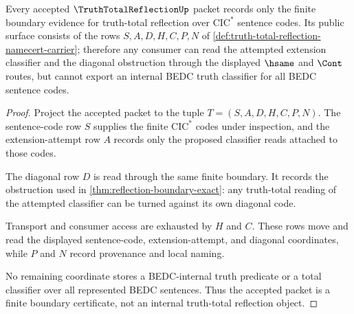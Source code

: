 \begin{theorem}
\label{thm:truth-total-reflection-namecert-boundary}
Every accepted $\TruthTotalReflectionUp$ packet records only the finite boundary evidence for truth-total reflection over $\mathrm{CIC}^{*}$ sentence codes. Its public surface consists of the rows $S,A,D,H,C,P,N$ of \autoref{def:truth-total-reflection-namecert-carrier}; therefore any consumer can read the attempted extension classifier and the diagonal obstruction through the displayed $\hsame$ and $\Cont$ routes, but cannot export an internal BEDC truth classifier for all BEDC sentence codes.
\end{theorem}
\begin{proof}
Project the accepted packet to the tuple $T=(S,A,D,H,C,P,N)$. The sentence-code row $S$ supplies the finite $\mathrm{CIC}^{*}$ codes under inspection, and the extension-attempt row $A$ records only the proposed classifier reads attached to those codes.

The diagonal row $D$ is read through the same finite boundary. It records the obstruction used in \autoref{thm:reflection-boundary-exact}: any truth-total reading of the attempted classifier can be turned against its own diagonal code.

Transport and consumer access are exhausted by $H$ and $C$. These rows move and read the displayed sentence-code, extension-attempt, and diagonal coordinates, while $P$ and $N$ record provenance and local naming.

No remaining coordinate stores a BEDC-internal truth predicate or a total classifier over all represented BEDC sentences. Thus the accepted packet is a finite boundary certificate, not an internal truth-total reflection object.
\end{proof}

